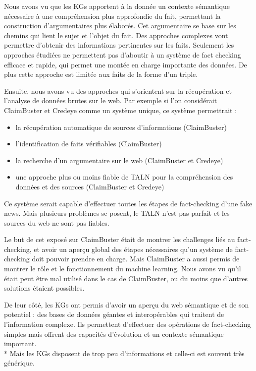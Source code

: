 Nous avons vu que les KGs apportent à la donnée un contexte sémantique nécessaire à une compréhension plus approfondie du fait, permettant la construction d'argumentaires plus élaborés. Cet argumentaire se base sur les chemins qui lient le sujet et l'objet du fait. Des approches complexes vont permettre d'obtenir des informations pertinentes sur les faits. Seulement les approches étudiées ne permettent pas d'aboutir à un système de fact checking efficace et rapide, qui permet une montée en charge importante des données. De plus cette approche est limitée aux faits de la forme d'un triple.

Ensuite, nous avons vu des approches qui s'orientent sur la récupération et l'analyse de données brutes sur le web. Par exemple si l'on considérait ClaimBuster et Credeye comme un système unique, ce système permettrait :
\begin{itemize}
    \item la récupération automatique de sources d'informations (ClaimBuster)
    \item l'identification de faits vérifiables (ClaimBuster)
    \item la recherche d'un argumentaire sur le web (ClaimBuster et Credeye)
    \item une approche plus ou moins fiable de TALN pour la compréhension des données et des sources (ClaimBuster et Credeye)
\end{itemize}
Ce système serait capable d'effectuer toutes les étapes de fact-checking d'une fake news. Mais plusieurs problèmes se posent, le TALN n'est pas parfait et les sources du web ne sont pas fiables. 

Le but de cet exposé sur ClaimBuster était de montrer les challenges liés au fact-checking, et avoir un aperçu global des étapes nécessaires qu'un système de fact-checking doit pouvoir prendre en charge. Mais ClaimBuster a aussi permis de montrer le rôle et le fonctionnement du machine learning. Nous avons vu qu'il était peut être mal utilisé dans le cas de ClaimBuster, ou du moins que d'autres solutions étaient possibles.

De leur côté, les KGs ont permis d'avoir un aperçu du web sémantique et de son potentiel : des bases de données géantes et interopérables qui traitent de l'information complexe. Ils permettent d'effectuer des opérations de fact-checking simples mais offrent des capacités d'évolution et un contexte sémantique important.
\\*
Mais les KGs disposent de trop peu d'informations et celle-ci est souvent très générique.

